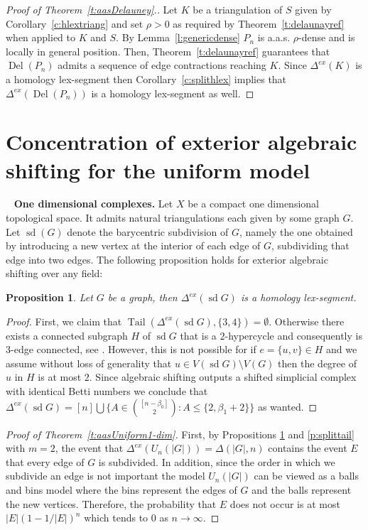 \documentclass[11pt]{article}
\newtheorem{proposition}[theorem]{Proposition}
\numberwithin{claimcounter}{theorem}
\theoremstyle{remark}
\theoremstyle{definition}
\numberwithin{theorem}{section}
\DeclareMathOperator{\sd}{sd}
\DeclareMathOperator{\tail}{Tail}
\DeclareMathOperator{\Del}{Del}
\newcommand{\exshift}[1]{\Delta^{ex}(#1)}
\begin{document}
%
\begin{proof}[Proof of Theorem~\ref{t:aasDelauney}.]
  Let $K$ be a triangulation of $S$ given by Corollary~\ref{c:hlextriang} and set $\rho > 0$ as required by Theorem~\ref{t:delaunayref} when applied to $K$ and $S$.
  By Lemma~\ref{l:genericdense} $P_n$ is a.a.s. $\rho$-dense and is locally in general position. Then, Theorem~\ref{t:delaunayref} guarantees that $\Del(P_n)$ admits a sequence of edge contractions reaching $K$. Since $\exshift{K}$ is a homology lex-segment then Corollary~\ref{c:splithlex} implies that $\exshift{\Del(P_n)}$ is a homology lex-segment as well.
\end{proof}
%
%
%
\section{Concentration of exterior algebraic shifting for the uniform model}~\label{sec:ass1dim}
\noindent
{\bf One dimensional complexes.}
Let $X$ be a compact one dimensional topological space.
It admits natural triangulations each given by some graph $G$. Let $\sd(G)$ denote the barycentric subdivision of $G$, namely the one obtained by introducing a new vertex at the interior of each edge of $G$, subdividing that edge into two edges.
The following proposition holds for exterior algebraic shifting over any field:
\begin{proposition}
    \label{p:graphsdlex}
    Let $G$ be a graph, then $\exshift{\sd G}$ is a homology lex-segment.
\end{proposition}
\begin{proof}
    First, we claim that $\tail(\exshift{\sd G},\{3,4\}) = \emptyset$. Otherwise there exists a connected subgraph $H$ of $\sd G$ that is a $2$-hypercycle and consequently is $3$-edge connected, see \cite[Theorem 5.4]{kalai85-hyperconnectivity}. However, this is not possible for if $e=\{u,v\}\in H$ and we assume without loss of generality that $u \in V(\sd G)\setminus V(G)$ then the degree of $u$ in $H$ is at most $2$.
    Since algebraic shifting outputs a shifted simplicial complex with identical Betti numbers we conclude that $\exshift{\sd G} = [n]\bigcup \{A\in \binom{[n-\beta_0]}{2}\colon A \leq \{2,\beta_1+2\}\}$ as wanted.
    \end{proof}
%
\begin{proof}[Proof of Theorem~\ref{t:aasUniform1-dim}]
    First, by Propositions \ref{p:graphsdlex} and \ref{p:splittail} with $m=2$, the event that $\exshift{U_n(|G|)}=\Delta(|G|,n)$ contains the event $E$  that every edge of $G$ is subdivided. 
    In addition, since the order in which we subdivide an edge is not important the model $U_n(|G|)$ can be viewed as a balls and bins model where the bins represent the edges of $G$ and the balls represent the new vertices. Therefore, the probability that $E$ does not occur is at most $|E|(1-1/|E|)^n$ which tends to $0$ as $n\to\infty.$
\end{proof}
\end{document}
